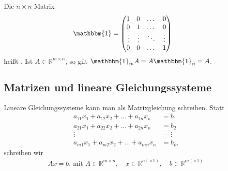Die $n \times n$ Matrix
\begin{align*}
    \mathbbm{1} &= \begin{pmatrix}
        1 & 0 & \dots & 0 \\
        0 & 1 & \dots & 0 \\
        \vdots & \vdots & \ddots & \vdots \\
        0 & 0 & \dots & 1
    \end{pmatrix}
\end{align*}
heißt . Ist $A \in \mathbb{R}^{m \times n}$, so gilt $\mathbbm{1}_m A = A \mathbbm{1}_n = A$.

\subsection{Matrizen und lineare Gleichungssysteme}
Lineare Gleichungssysteme kann man als Matrixgleichung schreiben. Statt
\begin{align*}
    a_{11}x_1 + a_{12}x_2 + \dots + a_{1n}x_n &= b_1 \\
    a_{21}x_1 + a_{22}x_2 + \dots + a_{2n}x_n &= b_2 \\
    \vdots &= \vdots \\
    a_{m1}x_1 + a_{m2}x_2 + \dots + a_{mn}x_n &= b_m
\end{align*}
schreiben wir
\begin{align*}
    A x = b\text{, mit } A \in \mathbb{R}^{m \times n},\quad x \in \mathbb{R}^{n(\times 1)},\quad b \in \mathbb{R}^{m (\times 1)}
\end{align*}

